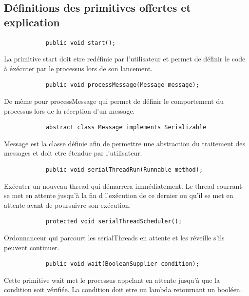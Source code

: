 \documentclass{article}
\begin{document}
			\newpage
			\subsection{Définitions des primitives offertes et explication}
			\begin{lstlisting}
			public void start();
			\end{lstlisting}
			La primitive start  doit etre redéfinie par l'utilisateur et permet de définir le code à éxécuter par le processus lors de son lancement.
			\vspace*{2.5mm}

			\begin{lstlisting}
			public void processMessage(Message message);
			\end{lstlisting}
			De même pour processMessage qui permet  de définir le comportement du processus lors de la réception d'un message.
			\vspace*{2.5mm}

			\begin{lstlisting}
			abstract class Message implements Serializable
			\end{lstlisting}
			Message est la classe définie afin de permettre une abstraction du traitement des messages et doit etre étendue par l'utilisateur.
			\vspace*{3mm}

			\begin{lstlisting}
			public void serialThreadRun(Runnable method);
			\end{lstlisting}
			Exécuter un nouveau thread qui démarrera immédiatement. 
			Le thread courrant se met en attente jusqu'à la fin d l'exécution de ce dernier ou qu'il se met en attente avant de poursuivre son exécution.
			\vspace*{3mm}

			\begin{lstlisting}
			protected void serialThreadScheduler();
			\end{lstlisting}
			Ordonnanceur qui parcourt les serialThreads en attente et les réveille s'ils peuvent continuer.
			\vspace*{3mm}

			\begin{lstlisting}
			public void wait(BooleanSupplier condition);
			\end{lstlisting}
			Cette primitive wait met le processus appelant en attente jusqu'à que la condition soit vérifiée.
			La condition doit etre un lambda retournant un booléen.
			\vspace*{3mm}
\end{document}
